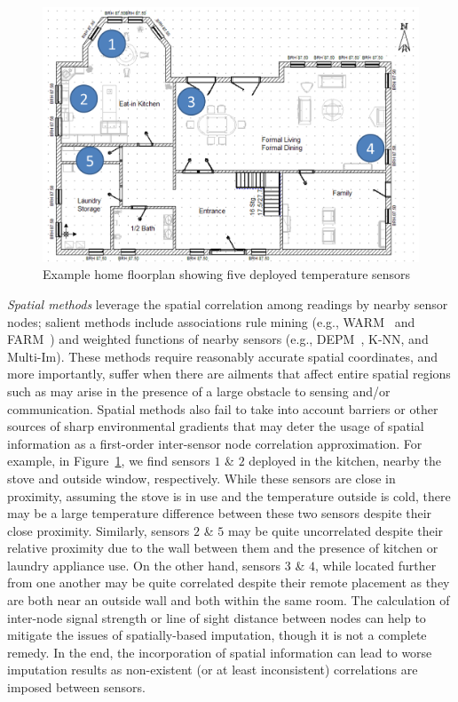 
\begin{figure}[ht]
\centering
\includegraphics[scale=0.35]{house_floorplan.png}
\caption{Example home floorplan showing five deployed temperature sensors} \label{house_floorplan}
\end{figure}

{\em Spatial methods} leverage the spatial correlation among readings
by nearby sensor nodes; salient methods include associations rule
mining (e.g., WARM~\cite{le2005estimating} and
FARM~\cite{Gruenwald:FARM}) 
and weighted functions of nearby sensors (e.g., DEPM~\cite{li2008data},
K-NN\cite{pan2010k}, and Multi-Im\cite{yuan2000multiple}).
These methods require reasonably accurate spatial coordinates, and
more importantly, suffer when there are ailments that affect entire
spatial regions such as may arise in the presence of a large obstacle
to sensing and/or communication.
Spatial methods also fail to take into account barriers or other
sources of sharp environmental gradients that may deter the usage of
spatial information as a first-order inter-sensor node correlation
approximation.  For example, in Figure~\ref{house_floorplan}, we find
sensors $1$ \& $2$ deployed in the kitchen, nearby the stove and
outside window, respectively. While these sensors are close in
proximity, assuming the stove is in use and the temperature outside is
cold, there may be a large temperature difference between these two
sensors despite their close proximity.  Similarly, sensors $2$ \& $5$
may be quite uncorrelated despite their relative proximity due to the
wall between them and the presence of kitchen or laundry appliance
use.  On the other hand, sensors $3$ \& $4$, while located further
from one another may be quite correlated despite their remote
placement as they are both near an outside wall and both within the
same room.  The calculation of
inter-node signal strength or line of sight distance between nodes can
help to mitigate the issues of spatially-based imputation, though it is not
a complete remedy.  In the end, the incorporation of spatial
information can lead to worse imputation results as non-existent (or
at least inconsistent) correlations are imposed between sensors.


